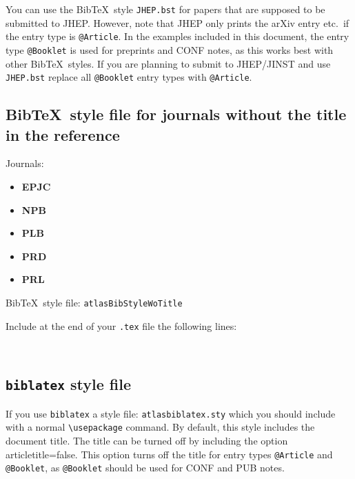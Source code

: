 \documentclass[UKenglish]{latex/atlasdoc}
\newcommand*{\BibTeX}{Bib\TeX}
\newcommand{\File}[1]{\texttt{#1}\xspace}
\newcommand{\Macro}[1]{\texttt{\textbackslash #1}\xspace}
\newcommand{\Option}[1]{\textsf{#1}\xspace}
\newcommand{\Package}[1]{\texttt{#1}\xspace}
\begin{document}
You can use the \BibTeX\ style \File{JHEP.bst} for papers that are supposed to be submitted to JHEP.
However, note that JHEP only prints the arXiv entry etc.\ if the entry type is \texttt{@Article}.
In the examples included in this document,
the entry type \texttt{@Booklet} is used for preprints and CONF notes,
as this works best with other \BibTeX\ styles.
If you are planning to submit to JHEP/JINST and use \File{JHEP.bst} 
replace all \texttt{@Booklet} entry types with \texttt{@Article}.


\subsection{\BibTeX\ style file for journals without the title in the reference}
\label{sec:wotitle}

Journals:
\begin{itemize}\setlength{\parskip}{0pt}\setlength{\itemsep}{0pt}
\item \textbf{EPJC}
\item \textbf{NPB}
\item \textbf{PLB}
\item \textbf{PRD}
\item \textbf{PRL}
\end{itemize}
%
\BibTeX\ style file: \Package{atlasBibStyleWoTitle}

\noindent Include at the end of your \File{.tex} file the following lines:
\begin{verbatim}


\end{verbatim}


\subsection{\Package{biblatex} style file}

If you use \Package{biblatex} a style file: \Package{atlasbiblatex.sty}
which you should include with a normal \Macro{usepackage} command.
By default, this style includes the document title.
The title can be turned off by including the option \Option{articletitle=false}.
This option turns off the title for entry types \texttt{@Article} and \texttt{@Booklet},
as \texttt{@Booklet} should be used for CONF and PUB notes.
\end{document}

